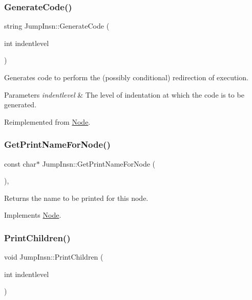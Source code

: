 \subsubsection{\texorpdfstring{Generate\+Code()}{GenerateCode()}}
{\footnotesize\ttfamily string Jump\+Insn\+::\+Generate\+Code (\begin{DoxyParamCaption}\item[{int}]{indentlevel }\end{DoxyParamCaption})\hspace{0.3cm}{\ttfamily [virtual]}}

Generates code to perform the (possibly conditional) redirection of execution. 
\begin{DoxyParams}{Parameters}
{\em indentlevel} & The level of indentation at which the code is to be generated. \\
\hline
\end{DoxyParams}


Reimplemented from \hyperlink{class_node_acb60e526730e8436056375a3055c2c32}{Node}.

\mbox{\label{class_jump_insn_a7cde864a50893f645d680015e3cb01c2}} 
\subsubsection{\texorpdfstring{Get\+Print\+Name\+For\+Node()}{GetPrintNameForNode()}}
{\footnotesize\ttfamily const char$\ast$ Jump\+Insn\+::\+Get\+Print\+Name\+For\+Node (\begin{DoxyParamCaption}{ }\end{DoxyParamCaption})\hspace{0.3cm}{\ttfamily [inline]}, {\ttfamily [virtual]}}

Returns the name to be printed for this node. 

Implements \hyperlink{class_node_a56e29657306ffb004d69c6929ae44269}{Node}.

\mbox{\label{class_jump_insn_a3ab29f081b7c25719c96b6104156c87a}} 
\subsubsection{\texorpdfstring{Print\+Children()}{PrintChildren()}}
{\footnotesize\ttfamily void Jump\+Insn\+::\+Print\+Children (\begin{DoxyParamCaption}\item[{int}]{indentlevel }\end{DoxyParamCaption})\hspace{0.3cm}{\ttfamily [virtual]}}

